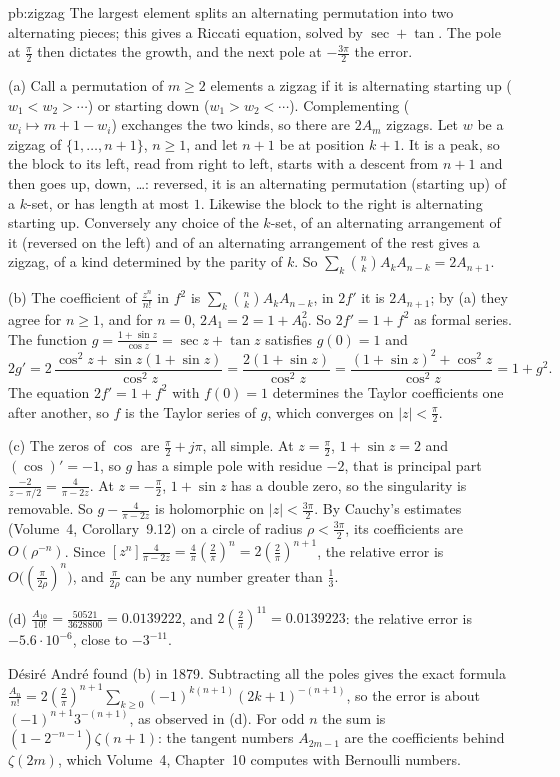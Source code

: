 \begin{solution}{pb:zigzag}
\idea The largest element splits an alternating permutation into two alternating pieces; this gives a Riccati equation, solved by $\sec+\tan$. The pole at $\frac\pi2$ then
dictates the growth, and the next pole at $-\frac{3\pi}2$ the error.

\writeup (a) Call a permutation of $m\ge2$ elements a zigzag if it is alternating starting up ($w_1<w_2>\cdots$) or starting down ($w_1>w_2<\cdots$). Complementing
($w_i\mapsto m+1-w_i$) exchanges the two kinds, so there are $2A_m$ zigzags. Let $w$ be a zigzag of $\{1,\dots,n+1\}$, $n\ge1$, and let $n+1$ be at position $k+1$. It is a peak, so
the block to its left, read from right to left, starts with a descent from $n+1$ and then goes up, down, \dots: reversed, it is an alternating permutation
(starting up) of a $k$-set, or has length at most $1$. Likewise the block to the right is alternating starting up. Conversely any choice of the $k$-set, of an alternating
arrangement of it (reversed on the left) and of an alternating arrangement of the rest gives a zigzag, of a kind determined by the parity of $k$. So
$\sum_k\binom nkA_kA_{n-k}=2A_{n+1}$.

(b) The coefficient of $\frac{z^n}{n!}$ in $f^2$ is $\sum_k\binom nkA_kA_{n-k}$, in $2f'$ it is $2A_{n+1}$; by (a) they agree for $n\ge1$, and for $n=0$, $2A_1=2=1+A_0^2$. So $2f'=1+f^2$
as formal series. The function $g=\frac{1+\sin z}{\cos z}=\sec z+\tan z$ satisfies $g(0)=1$ and
\[
2g'=2\,\frac{\cos^2z+\sin z(1+\sin z)}{\cos^2z}=\frac{2(1+\sin z)}{\cos^2z}=\frac{(1+\sin z)^2+\cos^2z}{\cos^2z}=1+g^2.
\]
The equation $2f'=1+f^2$ with $f(0)=1$ determines the Taylor coefficients one after another, so $f$ is the Taylor series of $g$, which converges on $|z|<\frac\pi2$.

(c) The zeros of $\cos$ are $\frac\pi2+j\pi$, all simple. At $z=\frac\pi2$, $1+\sin z=2$ and $(\cos)'=-1$, so $g$ has a simple pole with residue $-2$, that is principal part
$\frac{-2}{z-\pi/2}=\frac4{\pi-2z}$. At $z=-\frac\pi2$, $1+\sin z$ has a double zero, so the singularity is removable. So $g-\frac4{\pi-2z}$ is holomorphic on $|z|<\frac{3\pi}2$. By Cauchy's
estimates (Volume~4, Corollary~9.12) on a circle of radius $\rho<\frac{3\pi}2$, its coefficients are $O(\rho^{-n})$. Since $[z^n]\frac4{\pi-2z}=\frac4\pi(\frac2\pi)^n=2(\frac2\pi)^{n+1}$, the relative error is
$O\bigl((\frac\pi{2\rho})^n\bigr)$, and $\frac\pi{2\rho}$ can be any number greater than $\frac13$.

(d) $\frac{A_{10}}{10!}=\frac{50521}{3628800}=0.0139222$, and $2(\frac2\pi)^{11}=0.0139223$: the relative error is $-5.6\cdot10^{-6}$, close to $-3^{-11}$.

\leads D\'esir\'e Andr\'e found (b) in 1879. Subtracting all the poles gives the exact formula
$\frac{A_n}{n!}=2(\frac2\pi)^{n+1}\sum_{k\ge0}(-1)^{k(n+1)}(2k+1)^{-(n+1)}$, so the error is about $(-1)^{n+1}3^{-(n+1)}$, as observed in (d). For odd $n$ the sum is
$(1-2^{-n-1})\zeta(n+1)$: the tangent numbers $A_{2m-1}$ are the coefficients behind $\zeta(2m)$, which Volume~4, Chapter~10 computes with Bernoulli numbers.
\end{solution}

